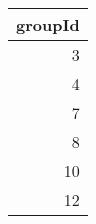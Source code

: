 \begin{tabular}{r}
\toprule
groupId \\
\midrule
3 \\
4 \\
7 \\
8 \\
10 \\
12 \\
\bottomrule
\end{tabular}
